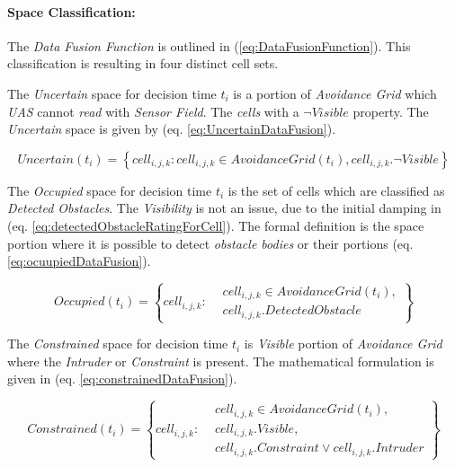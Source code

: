 \newpage
\paragraph{Space Classification:} The \emph{Data Fusion Function} is outlined in (\ref{eq:DataFusionFunction}). This classification is resulting in four distinct cell sets.

The \emph{Uncertain} space for decision time $t_i$ is a portion of \emph{Avoidance Grid} which \emph{UAS} cannot \emph{read} with \emph{Sensor Field}. The \emph{cells} with a $\neg Visible$ property. The \emph{Uncertain} space is given by (eq. \ref{eq:UncertainDataFusion}).

\begin{equation}\label{eq:UncertainDataFusion}
    Uncertain(t_i) = \left\{cell_{i,j,k}:cell_{i,j,k}\in AvoidanceGrid(t_i),cell_{i,j,k}.\neg Visible \right\}
\end{equation}

\noindent The \emph{Occupied} space for decision time $t_i$ is the set of cells which are classified as \emph{Detected Obstacles}. The \emph{Visibility} is not an issue, due to the initial damping in (eq. \ref{eq:detectedObstacleRatingForCell}). The formal definition is the space portion where it is possible to detect \emph{obstacle bodies} or their portions (eq. \ref{eq:ocuupiedDataFusion}).

\begin{equation}\label{eq:ocuupiedDataFusion}
    Occupied(t_i) = \left\{cell_{i,j,k}:\begin{aligned}&cell_{i,j,k}\in AvoidanceGrid(t_i),\\&cell_{i,j,k}.DetectedObstacle\end{aligned}\right\}
\end{equation}

\noindent The \emph{Constrained} space for decision time $t_i$ is \emph{Visible} portion of \emph{Avoidance Grid} where the \emph{Intruder} or \emph{Constraint} is present. The mathematical formulation is given in (eq. \ref{eq:constrainedDataFusion}).

\begin{equation}\label{eq:constrainedDataFusion}
    Constrained(t_i) = \left\{cell_{i,j,k}:
    \begin{aligned}
        &cell_{i,j,k} \in AvoidanceGrid(t_i),\\
        &cell_{i,j,k}.Visible,\\
        &cell_{i,j,k}.Constraint \vee cell_{i,j,k}.Intruder
    \end{aligned}\right\}
\end{equation}

